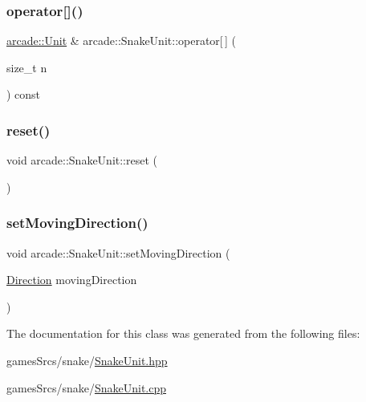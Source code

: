 \mbox{\label{classarcade_1_1_snake_unit_a364db276d19b00961a8e445bca7a2d55}} 
\subsubsection{\texorpdfstring{operator[]()}{operator[]()}\hspace{0.1cm}{\footnotesize\ttfamily [2/2]}}
{\footnotesize\ttfamily \hyperlink{classarcade_1_1_unit}{arcade\+::\+Unit} \& arcade\+::\+Snake\+Unit\+::operator\mbox{[}$\,$\mbox{]} (\begin{DoxyParamCaption}\item[{size\+\_\+t}]{n }\end{DoxyParamCaption}) const}

\mbox{\label{classarcade_1_1_snake_unit_aad0f18af64879c5ec44d9f14517abee6}} 
\subsubsection{\texorpdfstring{reset()}{reset()}}
{\footnotesize\ttfamily void arcade\+::\+Snake\+Unit\+::reset (\begin{DoxyParamCaption}{ }\end{DoxyParamCaption})}

\mbox{\label{classarcade_1_1_snake_unit_abc2d43a7920a1bdba452aa888a7e00d1}} 
\subsubsection{\texorpdfstring{set\+Moving\+Direction()}{setMovingDirection()}}
{\footnotesize\ttfamily void arcade\+::\+Snake\+Unit\+::set\+Moving\+Direction (\begin{DoxyParamCaption}\item[{\hyperlink{classarcade_1_1_unit_af418afeaba1f7fd5934b6ae1343215dd}{Direction}}]{moving\+Direction }\end{DoxyParamCaption})}



The documentation for this class was generated from the following files\+:\begin{DoxyCompactItemize}
\item 
games\+Srcs/snake/\hyperlink{_snake_unit_8hpp}{Snake\+Unit.\+hpp}\item 
games\+Srcs/snake/\hyperlink{_snake_unit_8cpp}{Snake\+Unit.\+cpp}\end{DoxyCompactItemize}
